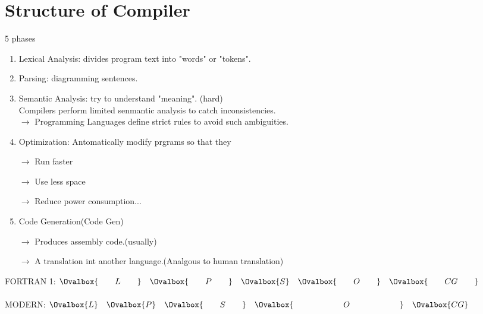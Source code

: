 \documentclass[11pt]{report}
\begin{document}
    \section{\textcolor{stanfordred}{Structure of Compiler}}
    5 phases
    \begin{enumerate}
        \item \textcolor{stanfordred}{Lexical Analysis}: divides program text into "words" or "tokens".
        \item \textcolor{stanfordred}{Parsing}: diagramming sentences.
        \item \textcolor{stanfordred}{Semantic Analysis}: try to understand "meaning". (hard)\\
        Compilers perform limited senmantic analysis to catch inconsistencies.\\
        \(\rightarrow\) Programming Languages define strict rules to avoid such ambiguities.
        \item \textcolor{stanfordred}{Optimization}: Antomatically modify prgrams so that they
        
        \(\rightarrow\) Run faster

        \(\rightarrow\) Use less space

        \(\rightarrow\) Reduce power consumption...

        \item \textcolor{stanfordred}{Code Generation(Code Gen)}
        
        \(\rightarrow\) Produces assembly code.(usually)

        \(\rightarrow\) A translation int another language.(Analgous to human translation)

    \end{enumerate}
    \begin{flushleft}
        FORTRAN 1: \(\Ovalbox{\quad\quad L \quad\quad}\quad\Ovalbox{\quad\quad P \quad\quad}\quad\Ovalbox{S}\quad\Ovalbox{\quad\quad O \quad\quad}\quad\Ovalbox{\quad\quad CG \quad\quad}\)\\
        \hspace*{\fill} \\
        \quad MODERN: \(\Ovalbox{ L }\quad\Ovalbox{ P }\quad\Ovalbox{\quad\quad S\quad\quad}\quad\Ovalbox{\quad\quad\quad\quad\quad\quad O \quad\quad\quad\quad\quad\quad}\quad\Ovalbox{ CG }\)\\
    \end{flushleft}
    
\end{document}
